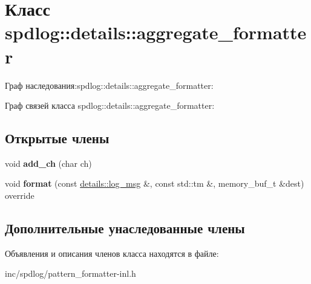 \hypertarget{classspdlog_1_1details_1_1aggregate__formatter}{}\section{Класс spdlog\+:\+:details\+:\+:aggregate\+\_\+formatter}
\label{classspdlog_1_1details_1_1aggregate__formatter}


Граф наследования\+:spdlog\+:\+:details\+:\+:aggregate\+\_\+formatter\+:


Граф связей класса spdlog\+:\+:details\+:\+:aggregate\+\_\+formatter\+:
\subsection*{Открытые члены}
\begin{DoxyCompactItemize}
\item 
\mbox{\label{classspdlog_1_1details_1_1aggregate__formatter_aa4a450cafac2ed6ef1fdc6dbda962ac6}} 
void {\bfseries add\+\_\+ch} (char ch)
\item 
\mbox{\label{classspdlog_1_1details_1_1aggregate__formatter_aa6d1b6b363434cdd34f296e91386c67f}} 
void {\bfseries format} (const \hyperlink{structspdlog_1_1details_1_1log__msg}{details\+::log\+\_\+msg} \&, const std\+::tm \&, memory\+\_\+buf\+\_\+t \&dest) override
\end{DoxyCompactItemize}
\subsection*{Дополнительные унаследованные члены}


Объявления и описания членов класса находятся в файле\+:\begin{DoxyCompactItemize}
\item 
inc/spdlog/pattern\+\_\+formatter-\/inl.\+h\end{DoxyCompactItemize}
